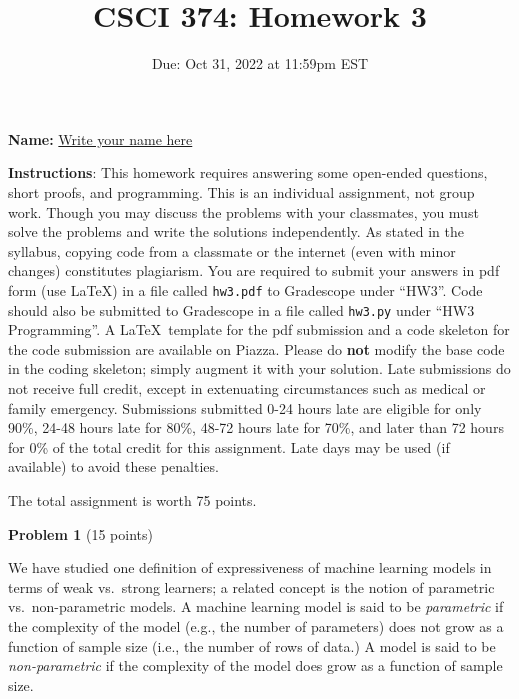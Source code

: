 \documentclass[letterpaper, 11pt]{article}
\title{CSCI 374: Homework 3}
\author{}
\date{Due: Oct 31, 2022 at 11:59pm EST}
\begin{document}
\maketitle

\setlength{\parindent}{0em}
\setlength{\parskip}{0.8em}

\textbf{Name:} \underline{\hspace{30pt} \color{blue} Write your name here \hspace{30pt}}
\vspace{1em}

	\textbf{Instructions}: This homework requires answering some open-ended questions, short proofs, and
	programming. This is an individual assignment, not group work. Though you may
	discuss the problems with your classmates, you must solve the problems and
	write the solutions independently. As stated in the syllabus, copying code
	from a classmate or the internet (even with minor changes) constitutes
	plagiarism. You are required to submit your answers in pdf form (use \LaTeX)
	in a file called \texttt{hw3.pdf} to Gradescope under ``HW3''. Code should also be submitted to Gradescope in a file called \texttt{hw3.py} under ``HW3 Programming''. A \LaTeX\  template for the pdf submission and a code skeleton for the code submission are available on Piazza. Please do \textbf{not} modify the base code in the coding skeleton; simply augment it with your solution.
	Late submissions do not receive full credit, except in extenuating circumstances such
	as medical or family emergency. Submissions submitted 0-24 hours late are eligible for only 90\%, 24-48 hours late for 80\%, 48-72 hours late for 70\%, and later
	than 72 hours for 0\% of the total credit for this assignment. Late days may be used (if available) to avoid these penalties.
	
	The total assignment is worth 75 points.

\vspace{1em}

{\large\textbf{Problem 1}} (15 points)

We have studied one definition of expressiveness of machine learning models in terms of weak vs.~strong learners; a related concept is the notion of parametric vs.~non-parametric models. A machine learning model is said to be \emph{parametric} if the complexity of the model (e.g., the number of parameters) does not grow as a function of sample size (i.e., the number of rows of data.) A model is said to be \emph{non-parametric} if the complexity of the model does grow as a function of sample size.
\end{document}
